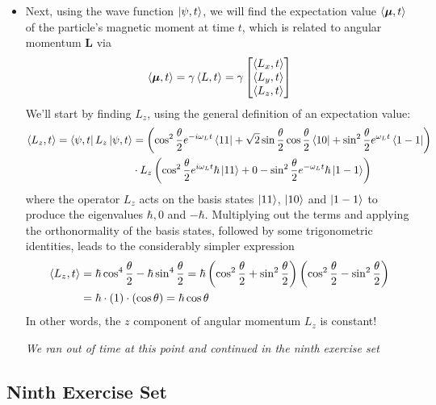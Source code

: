 \documentclass[11pt, a4paper]{article}
\renewcommand{\vec}[1]{\bm{#1}} %
\newcommand{\m}{\vec{\mu}}  %
\begin{document}
\begin{itemize}
	\item Next, using the wave function $ \ket{\psi, t} $, we will find the expectation value $ \ev{\m, t} $ of the particle's magnetic moment at time $ t $, which is related to angular momentum $ \vec{L} $ via
	\begin{equation*}
		\ev{\m, t} = \gamma \ev{L, t} = \gamma
		\begin{bmatrix}
			\ev{L_{x}, t}\\
			\ev{L_{y}, t}\\
			\ev{L_{z}, t}
		\end{bmatrix}
	\end{equation*}
	We'll start by finding $ L_{z} $, using the general definition of an expectation value:
	\begin{align*}
		\ev{L_{z}, t} = \bra{\psi, t}L_{z}\ket{\psi, t} &= \left(\cos^{2} \frac{\theta}{2} e^{-i \omega_{L} t}\bra{11} + \sqrt{2}\sin \frac{\theta}{2} \cos \frac{\theta}{2} \bra{10} + \sin^{2}\frac{\theta}{2} e^{\omega_{L} t}\bra{1 -1}\right) \\
		&\cdot L_{z}\left(\cos^{2} \frac{\theta}{2} e^{i \omega_{L} t}\hbar\ket{11} + 0 - \sin^{2}\frac{\theta}{2} e^{-\omega_{L} t}\hbar\ket{1 -1}\right)
	\end{align*}
	where the operator $ L_{z} $ acts on the basis states $ \ket{11} $, $ \ket{10} $ and $ \ket{1-1} $ to produce the eigenvalues $ \hbar, 0 $ and $ -\hbar $. Multiplying out the terms and applying the orthonormality of the basis states, followed by some trigonometric identities, leads to the considerably simpler expression
	\begin{align*}
		\ev{L_{z}, t} &= \hbar \cos^{4}\frac{\theta}{2} - \hbar \sin^{4}\frac{\theta}{2} = \hbar\left(\cos^{2}\frac{\theta}{2} +  \sin^{2}\frac{\theta}{2}\right)\left(\cos^{2}\frac{\theta}{2} -  \sin^{2}\frac{\theta}{2}\right)\\
		&=\hbar\cdot (1) \cdot (\cos \theta) = \hbar \cos \theta
	\end{align*}
	In other words, the $ z $ component of angular momentum $ L_{z} $ is constant!
	
	\textit{We ran out of time at this point and continued in the ninth exercise set}
	
\end{itemize}

\subsection{Ninth Exercise Set}
\end{document}
